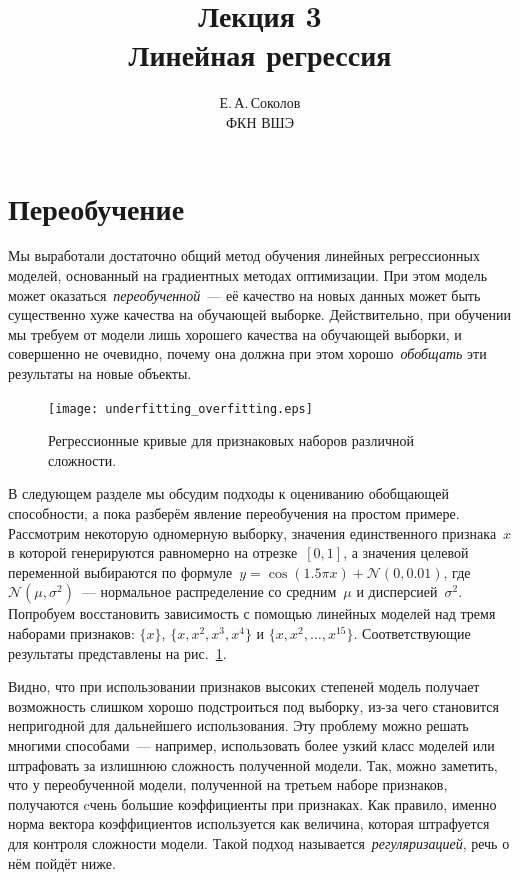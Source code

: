 \documentclass[12pt,fleqn]{article}
\begin{document}
\title{Лекция 3\\Линейная регрессия}
\author{Е.\,А.\,Соколов\\ФКН ВШЭ}
\maketitle

\section{Переобучение}

Мы выработали достаточно общий метод обучения линейных регрессионных моделей,
основанный на градиентных методах оптимизации.
При этом модель может оказаться~\emph{переобученной}~--- её качество
на новых данных может быть существенно хуже качества на обучающей выборке.
Действительно, при обучении мы требуем от модели лишь хорошего качества на обучающей выборки,
и совершенно не очевидно, почему она должна при этом хорошо~\emph{обобщать} эти результаты
на новые объекты.

\begin{figure}[t]
    \centering
    \texttt{[image: underfitting\_overfitting.eps]}
    \caption{Регрессионные кривые для признаковых наборов различной сложности.}
    \label{fig:overfitting}
\end{figure}

В следующем разделе мы обсудим подходы к оцениванию обобщающей способности,
а пока разберём явление переобучения на простом примере.
Рассмотрим некоторую одномерную выборку, значения единственного признака~$x$
в которой генерируются равномерно на отрезке~$[0, 1]$,
а значения целевой переменной выбираются по формуле~$y = \cos(1.5 \pi x) + \mathcal{N}(0, 0.01)$,
где~$\mathcal{N}(\mu, \sigma^2)$~--- нормальное распределение со средним~$\mu$ и дисперсией~$\sigma^2$.
Попробуем восстановить зависимость с помощью линейных моделей над тремя наборами признаков:
$\{x\}$, $\{x, x^2, x^3, x^4\}$ и $\{x, x^2, \dots, x^{15}\}$.
Соответствующие результаты представлены на рис.~\ref{fig:overfitting}.

Видно, что при использовании признаков высоких степеней модель получает возможность
слишком хорошо подстроиться под выборку, из-за чего становится непригодной для дальнейшего использования.
Эту проблему можно решать многими способами~--- например, использовать более узкий класс моделей
или штрафовать за излишнюю сложность полученной модели.
Так, можно заметить, что у переобученной модели, полученной на третьем наборе признаков,
получаются cчень большие коэффициенты при признаках.
Как правило, именно норма вектора коэффициентов используется как величина,
которая штрафуется для контроля сложности модели.
Такой подход называется~\emph{регуляризацией}, речь о нём пойдёт ниже.
\end{document}
